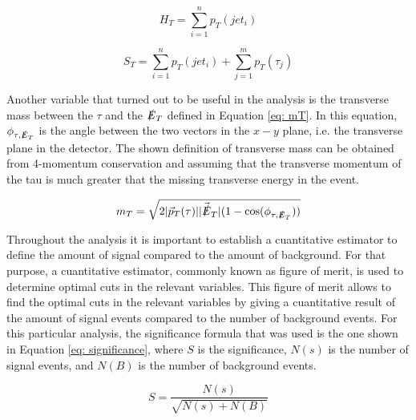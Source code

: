 \begin{equation}
 H_{T} = \sum_{i=1}^{n} p_{T}(jet_{i})
 \label{eq: HT}
\end{equation}

\begin{equation}
 S_{T} = \sum_{i=1}^{n} p_{T}(jet_{i}) + \sum_{j=1}^{m} p_{T}(\tau_{j})
 \label{eq: ST}
\end{equation}

Another variable that turned out to be useful in the analysis is the transverse mass between the $\tau$ and the $\slashed{E}_{T}$ defined in Equation \ref{eq: mT}. In this equation, $\phi_{\tau, \slashed{E}_{T}}$ is the angle between the two vectors in the $x-y$ plane, i.e. the transverse plane in the detector. The shown definition of transverse mass can be obtained from 4-momentum conservation and assuming that the transverse momentum of the tau is much greater that the missing transverse energy in the event. 

\begin{equation}\label{eq: mT}
m_{T} = \sqrt{2 |\vec{p}_{T}(\tau)|| \vec{\slashed{E}}_{T}| (1 - \cos(\phi_{\tau, \slashed{E}_{T} }))}
\end{equation}

Throughout the analysis it is important to establish a cuantitative estimator to define the amount of signal compared to the amount of background. For that purpose, a cuantitative estimator, commonly known as figure of merit, is used to determine optimal cuts in the relevant variables. This figure of merit allows to find the optimal cuts in the relevant variables by giving a cuantitative result of the amount of signal events compared to the number of background events. For this particular analysis, the significance formula that was used is the one shown in Equation \ref{eq: significance}, where $S$ is the significance, $N(s)$ is the number of signal events, and $N(B)$ is the number of background events.

\begin{equation} \label{eq: significance}
    S = \frac{N(s)}{\sqrt{N(s) + N(B)}}
\end{equation}






 



